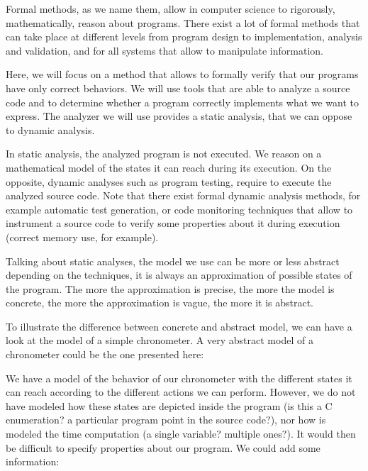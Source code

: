 Formal methods, as we name them, allow in computer science to
rigorously, mathematically, reason about programs. There exist a lot of
formal methods that can take place at different levels from program
design to implementation, analysis and validation, and for all systems
that allow to manipulate information.



Here, we will focus on a method that allows to formally verify that our
programs have only correct behaviors. We will use tools that are able to
analyze a source code and to determine whether a program correctly
implements what we want to express. The analyzer we will use provides a
static analysis, that we can oppose to dynamic analysis.



In static analysis, the analyzed program is not executed. We reason on a
mathematical model of the states it can reach during its execution. On
the opposite, dynamic analyses such as program testing, require to
execute the analyzed source code. Note that there exist formal dynamic
analysis methods, for example automatic test generation, or code
monitoring techniques that allow to instrument a source code to verify
some properties about it during execution (correct memory use, for
example).



Talking about static analyses, the model we use can be more or less
abstract depending on the techniques, it is always an approximation of
possible states of the program. The more the approximation is precise,
the more the model is concrete, the more the approximation is vague, the
more it is abstract.



To illustrate the difference between concrete and abstract model, we can
have a look at the model of a simple chronometer. A very abstract model of
a chronometer could be the one presented here:





We have a model of the behavior of our chronometer with the different
states it can reach according to the different actions we can perform.
However, we do not have modeled how these states are depicted inside the
program (is this a C enumeration? a particular program point in the
source code?), nor how is modeled the time computation (a single
variable? multiple ones?). It would then be difficult to specify
properties about our program. We could add some information:


